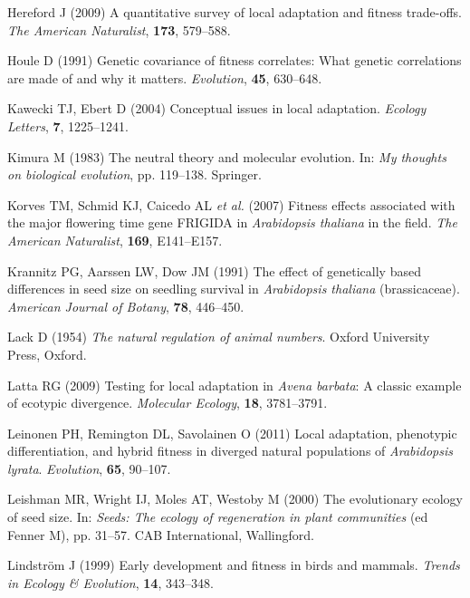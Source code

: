 \documentclass[
]{article}
\begin{document}
\leavevmode\hypertarget{ref-Hereford2009}{}%
Hereford J (2009) A quantitative survey of local adaptation and fitness trade-offs. \emph{The American Naturalist}, \textbf{173}, 579--588.

\leavevmode\hypertarget{ref-Houle1991}{}%
Houle D (1991) Genetic covariance of fitness correlates: What genetic correlations are made of and why it matters. \emph{Evolution}, \textbf{45}, 630--648.

\leavevmode\hypertarget{ref-Kawecki2004}{}%
Kawecki TJ, Ebert D (2004) Conceptual issues in local adaptation. \emph{Ecology Letters}, \textbf{7}, 1225--1241.

\leavevmode\hypertarget{ref-kimura2020neutral}{}%
Kimura M (1983) The neutral theory and molecular evolution. In: \emph{My thoughts on biological evolution}, pp. 119--138. Springer.

\leavevmode\hypertarget{ref-korves2007fitness}{}%
Korves TM, Schmid KJ, Caicedo AL \emph{et al.} (2007) Fitness effects associated with the major flowering time gene FRIGIDA in \emph{Arabidopsis thaliana} in the field. \emph{The American Naturalist}, \textbf{169}, E141--E157.

\leavevmode\hypertarget{ref-krannitz1991effect}{}%
Krannitz PG, Aarssen LW, Dow JM (1991) The effect of genetically based differences in seed size on seedling survival in \emph{Arabidopsis thaliana} (brassicaceae). \emph{American Journal of Botany}, \textbf{78}, 446--450.

\leavevmode\hypertarget{ref-Lack1954}{}%
Lack D (1954) \emph{The natural regulation of animal numbers}. Oxford University Press, Oxford.

\leavevmode\hypertarget{ref-Latta2009}{}%
Latta RG (2009) Testing for local adaptation in \emph{Avena barbata}: A classic example of ecotypic divergence. \emph{Molecular Ecology}, \textbf{18}, 3781--3791.

\leavevmode\hypertarget{ref-leinonen2011local}{}%
Leinonen PH, Remington DL, Savolainen O (2011) Local adaptation, phenotypic differentiation, and hybrid fitness in diverged natural populations of \emph{Arabidopsis lyrata}. \emph{Evolution}, \textbf{65}, 90--107.

\leavevmode\hypertarget{ref-Leishman2000}{}%
Leishman MR, Wright IJ, Moles AT, Westoby M (2000) The evolutionary ecology of seed size. In: \emph{Seeds: The ecology of regeneration in plant communities} (ed Fenner M), pp. 31--57. CAB International, Wallingford.

\leavevmode\hypertarget{ref-lindstrom1999early}{}%
Lindström J (1999) Early development and fitness in birds and mammals. \emph{Trends in Ecology \& Evolution}, \textbf{14}, 343--348.
\end{document}
